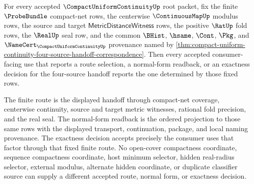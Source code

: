 \begin{corollary}
\label{cor:compact-uniform-continuity-four-source-handoff-consumer-determinacy}
For every accepted $\CompactUniformContinuityUp$ root packet, fix the finite $\ProbeBundle$ compact-net rows, the centerwise $\ContinuousMapUp$ modulus rows, the source and target $\mathsf{MetricDistanceWitness}$ rows, the positive $\RatUp$ fold rows, the $\RealUp$ seal row, and the common $\BHist$, $\hsame$, $\Cont$, $\Pkg$, and $\NameCert_{\CompactUniformContinuityUp}$ provenance named by \autoref{thm:compact-uniform-continuity-four-source-handoff-correspondence}. Then every accepted consumer-facing use that reports a route selection, a normal-form readback, or an exactness decision for the four-source handoff reports the one determined by those fixed rows.

The finite route is the displayed handoff through compact-net coverage, centerwise continuity, source and target metric witnesses, rational fold precision, and the real seal. The normal-form readback is the ordered projection to those same rows with the displayed transport, continuation, package, and local naming provenance. The exactness decision accepts precisely the consumer uses that factor through that fixed finite route. No open-cover compactness coordinate, sequence compactness coordinate, host minimum selector, hidden real-radius selector, external modulus, alternate hidden coordinate, or duplicate classifier source can supply a different accepted route, normal form, or exactness decision.
\end{corollary}
